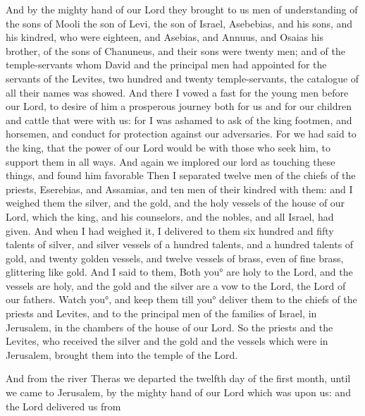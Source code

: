 {And by the mighty hand of our Lord they brought to us
 men of understanding of the sons of
 Mooli the son of Levi, the son of Israel,
 Asebebias, and his sons, and his kindred, who were eighteen,
and
 Asebias, and Annuus, and Osaias his brother, of the sons of Chanuneus, and their sons were twenty men;
and of the temple-servants whom David and the principal men had appointed for the servants of the Levites, two hundred and twenty temple-servants, the catalogue of all their names was showed.
And there I vowed a fast for the young men before our Lord, to desire of him a prosperous journey both for us and for our children and cattle that were with us:
for I was ashamed to ask of the king footmen, and horsemen, and conduct for protection against our adversaries.
For we had said to the king, that the power of our Lord would be with those who seek him, to support them in all ways.
And again we implored our lord as touching these things, and found him favorable
{}
Then I separated twelve men of the chiefs of the priests,
 Eserebias, and Assamias, and ten men of their kindred with them:
and I weighed them the silver, and the gold, and the holy vessels of the house of our Lord, which the king, and his counselors, and the nobles, and all Israel, had given.
And when I had weighed it, I delivered to them six hundred and fifty talents of silver, and silver vessels of a hundred talents, and a hundred talents of gold,
and twenty golden vessels, and twelve vessels of brass, even of fine brass, glittering like gold.
And I said to them, Both you° are holy to the Lord,
 and the vessels are holy, and the gold and the silver are a vow to the Lord, the Lord of our fathers.
Watch you°, and keep them till you° deliver them to the chiefs of the priests and Levites, and to the principal men of the families of Israel, in Jerusalem, in the chambers of the house of our Lord.
So the priests and the Levites, who received the silver and the gold and the vessels which were in Jerusalem, brought them into the temple of the Lord.
\par }{\PP {}And from the river Theras we departed the twelfth day of the first month, until we came to Jerusalem, by the mighty hand of our Lord which was upon us: and the Lord delivered us from
}
